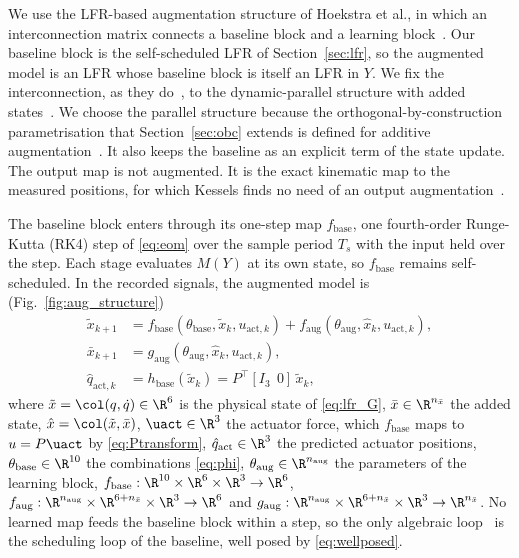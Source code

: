 We use the LFR-based augmentation structure of Hoekstra et al., in which an
interconnection matrix connects a baseline block and a learning
block~\cite[Sec.~3.1]{hoekstra2025lfr}.
Our baseline block is the self-scheduled LFR of Section~\ref{sec:lfr}, so the
augmented model is an LFR whose baseline block is itself an LFR in $Y$.
We fix the interconnection, as they do~\cite[Sec.~3.2]{hoekstra2025lfr}, to the
dynamic-parallel structure with added states~\cite[Table~1]{hoekstra2026lfr}.
We choose the parallel structure because the orthogonal-by-construction
parametrisation that Section~\ref{sec:obc} extends is defined for additive
augmentation~\cite{gyorok2026obc}.
It also keeps the baseline as an explicit term of the state update.
The output map is not augmented.
It is the exact kinematic map to the measured positions, for which Kessels
finds no need of an output augmentation~\cite[Remark~5.3]{kessels2025ai}.

The baseline block enters through its one-step map $f_{\mathrm{base}}$, one
fourth-order Runge-Kutta (RK4) step of \eqref{eq:eom} over the sample period
$T_s$ with the input held over the step.
Each stage evaluates $M(Y)$ at its own state, so $f_{\mathrm{base}}$ remains
self-scheduled.
In the recorded signals, the augmented model is
(Fig.~\ref{fig:aug_structure})
\begin{equation}
\begin{aligned}
 \tilde x_{k+1}
 &=f_{\mathrm{base}}(\theta_{\mathrm{base}},\tilde x_k,u_{\mathrm{act},k})
   +f_{\mathrm{aug}}(\theta_{\mathrm{aug}},\hat x_k,u_{\mathrm{act},k}),\\
 \bar x_{k+1}
 &=g_{\mathrm{aug}}(\theta_{\mathrm{aug}},\hat x_k,u_{\mathrm{act},k}),\\
 \hat q_{\mathrm{act},k}&=h_{\mathrm{base}}(\tilde x_k)=P^\top[I_3\;\,0]\,\tilde x_k,
\end{aligned}
\label{eq:aug_transition}
\end{equation}
where $\tilde x=\col(q,\dot q)\in\R^6$ is the physical state of
\eqref{eq:lfr_G}, $\bar x\in\R^{n_{\bar x}}$ the added state,
$\hat x=\col(\tilde x,\bar x)$, $\uact\in\R^3$ the actuator force, which
$f_{\mathrm{base}}$ maps to $u=P\uact$ by \eqref{eq:Ptransform},
$\hat q_{\mathrm{act}}\in\R^3$ the predicted actuator positions,
$\theta_{\mathrm{base}}\in\R^{10}$ the combinations \eqref{eq:phi},
$\theta_{\mathrm{aug}}\in\R^{n_{\mathrm{aug}}}$ the parameters of the learning
block, $f_{\mathrm{base}}:\R^{10}\times\R^6\times\R^3\to\R^6$,
$f_{\mathrm{aug}}:\R^{n_{\mathrm{aug}}}\times\R^{6+n_{\bar x}}\times\R^3\to\R^6$
and
$g_{\mathrm{aug}}:\R^{n_{\mathrm{aug}}}\times\R^{6+n_{\bar x}}\times\R^3\to\R^{n_{\bar x}}$.
No learned map feeds the baseline block within a step, so the only algebraic
loop~\cite[Thm.~1]{hoekstra2025lfr} is the scheduling loop of the baseline,
well posed by \eqref{eq:wellposed}.

